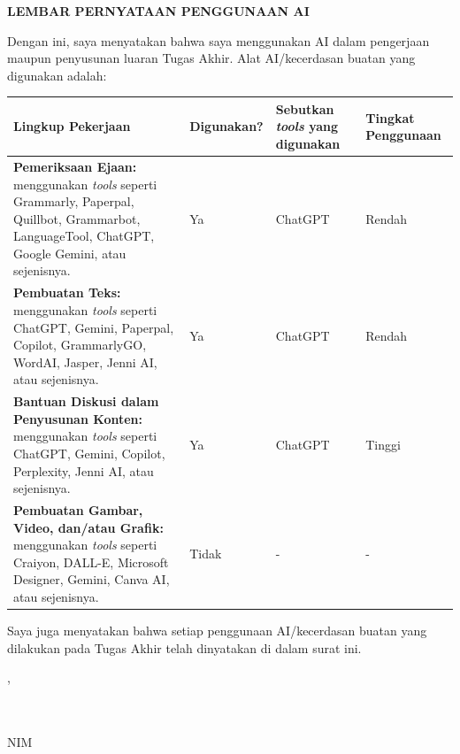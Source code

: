 \clearpage
\pagestyle{empty}

\begin{center}
    {\large\bfseries LEMBAR PERNYATAAN PENGGUNAAN AI}
\end{center}

\begin{singlespace}

Dengan ini, saya menyatakan bahwa saya menggunakan AI dalam pengerjaan maupun penyusunan luaran Tugas Akhir. Alat AI/kecerdasan buatan yang digunakan adalah:

\vspace{0.6cm}

{\small
\renewcommand{\arraystretch}{1.2}
\setlength{\tabcolsep}{5pt}
\noindent
\begin{tabularx}{\textwidth}{|>{\raggedright\arraybackslash}X|>{\centering\arraybackslash}p{2.1cm}|>{\centering\arraybackslash}p{2.4cm}|>{\centering\arraybackslash}p{2.1cm}|}
    \hline
    \centering\textbf{Lingkup Pekerjaan} & \textbf{Digunakan?} & \textbf{Sebutkan \textit{tools} yang digunakan} & \textbf{Tingkat Penggunaan} \\
    \hline
    \textbf{Pemeriksaan Ejaan:} menggunakan \textit{tools} seperti Grammarly, Paperpal, Quillbot, Grammarbot, LanguageTool, ChatGPT, Google Gemini, atau sejenisnya.
    & Ya & ChatGPT & Rendah \\
    \hline
    \textbf{Pembuatan Teks:} menggunakan \textit{tools} seperti ChatGPT, Gemini, Paperpal, Copilot, GrammarlyGO, WordAI, Jasper, Jenni AI, atau sejenisnya.
    & Ya & ChatGPT & Rendah \\
    \hline
    \textbf{Bantuan Diskusi dalam Penyusunan Konten:} menggunakan \textit{tools} seperti ChatGPT, Gemini, Copilot, Perplexity, Jenni AI, atau sejenisnya.
    & Ya & ChatGPT & Tinggi \\
    \hline
    \textbf{Pembuatan Gambar, Video, dan/atau Grafik:} menggunakan \textit{tools} seperti Craiyon, DALL-E, Microsoft Designer, Gemini, Canva AI, atau sejenisnya.
    & Tidak & - & - \\
    \hline
\end{tabularx}}

\vspace{0.6cm}

Saya juga menyatakan bahwa setiap penggunaan AI/kecerdasan buatan yang dilakukan pada Tugas Akhir telah dinyatakan di dalam surat ini.

\begin{flushright}
    \vspace{0.75cm}
    \SubmissionCity, \ApprovalDate

    \vspace{0.3cm}
    \AuthorSignature\\[-0.2cm]
    \AuthorName \\
    NIM \StudentID
\end{flushright}

\end{singlespace}

\clearpage
